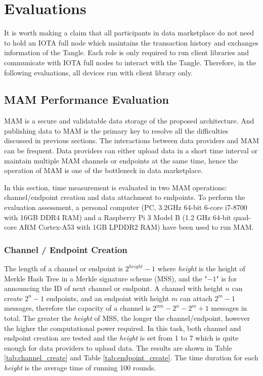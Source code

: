 \documentclass[conference]{IEEEtran}
\begin{document}
\section{Evaluations}
It is worth making a claim that all participants in data marketplace do not need to hold an IOTA full node which maintains the transaction history and exchanges information of the Tangle. Each role is only required to run client libraries and communicate with IOTA full nodes to interact with the Tangle. Therefore, in the following evaluations, all devices run with client library only.

\subsection{MAM Performance Evaluation}
MAM is a secure and validatable data storage of the proposed architecture. And publishing data to MAM is the primary key to resolve all the difficulties discussed in previous sections. The interactions between data providers and MAM can be frequent. Data providers can either upload data in a short time interval or maintain multiple MAM channels or endpoints at the same time, hence the operation of MAM is one of the bottleneck in data marketplace.

In this section, time measurement is evaluated in two MAM operations: channel/endpoint creation and data attachment to endpoints. To perform the evaluation assessment, a personal computer (PC, 3.2GHz 64-bit 6-core i7-8700 with 16GB DDR4 RAM) and a Raspberry Pi 3 Model B (1.2 GHz 64-bit quad-core ARM Cortex-A53 with 1GB LPDDR2 RAM) have been used to run MAM. 

\subsubsection{Channel / Endpoint Creation}
The length of a channel or endpoint is $2^{height}-1$ where \textit{height} is the height of Merkle Hash Tree in a Merkle signature scheme (MSS), and the "$-1$" is for announcing the ID of next channel or endpoint. A channel with height $n$ can create $2^n-1$ endpoints, and an endpoint with height $m$ can attach $2^m-1$ messages, therefore the capacity of a channel is $2^{nm}-2^n-2^m+1$ messages in total. The greater the \textit{height} of MSS, the longer the channel/endpoint, however the higher the computational power required. In this task, both channel and endpoint creation are tested and the \textit{height} is set from 1 to 7 which is quite enough for data providers to upload data. The results are shown in Table \ref{tab:channel_create} and Table \ref{tab:endpoint_create}. The time duration for each \textit{height} is the average time of running 100 rounds.
\end{document}
